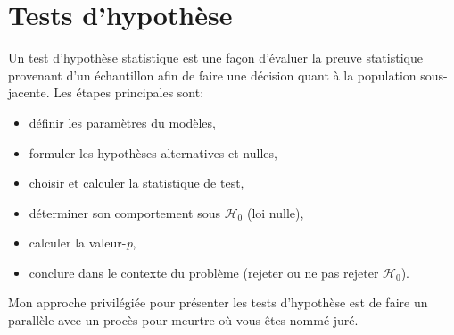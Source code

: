 \documentclass[
  11pt,
  letterpaper,
]{book}
\providecommand{\tightlist}{%
  \setlength{\itemsep}{0pt}\setlength{\parskip}{0pt}}
\theoremstyle{definition}
\theoremstyle{definition}
\theoremstyle{definition}
\theoremstyle{remark}
\begin{document}
\hypertarget{tests}{%
\section{Tests d'hypothèse}\label{tests}}

Un test d'hypothèse statistique est une façon d'évaluer la preuve statistique provenant d'un échantillon afin de faire une décision quant à la population sous-jacente. Les étapes principales sont:

\begin{itemize}
\tightlist
\item
  définir les paramètres du modèles,
\item
  formuler les hypothèses alternatives et nulles,
\item
  choisir et calculer la statistique de test,
\item
  déterminer son comportement sous \(\mathscr{H}_0\) (loi nulle),
\item
  calculer la valeur-\emph{p},
\item
  conclure dans le contexte du problème (rejeter ou ne pas rejeter \(\mathscr{H}_0\)).
\end{itemize}

Mon approche privilégiée pour présenter les tests d'hypothèse est de faire un parallèle avec un procès pour meurtre où vous êtes nommé juré.
\end{document}
